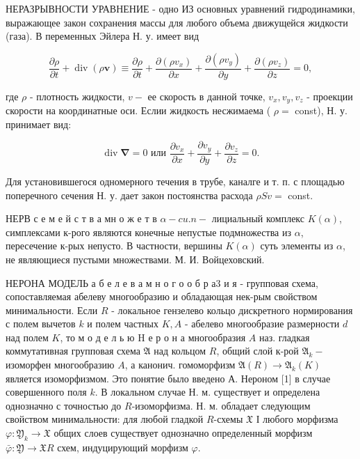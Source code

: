 \documentclass[10pt]{article}
\begin{document}
НЕРАЗРЫВНОСТИ УРАВНЕНИЕ - одно ИЗ основных уравнений гидродинамики, выражающее закон сохранения массы для любого объема движущейся жидкости (газа). В переменных Эйлера Н. у. имеет вид



\[

\frac{\partial \rho}{\partial t}+\operatorname{div}(\rho \boldsymbol{v}) \equiv \frac{\partial \rho}{\partial t}+\frac{\partial\left(\rho v_{x}\right)}{\partial x}+\frac{\partial\left(\rho v_{y}\right)}{\partial y}+\frac{\partial\left(\rho v_{z}\right)}{\partial z}=0,

\]



где $\rho$ - плотность жидкости, $v-$ ее скорость в данной точке, $v_{x}, v_{y}, v_{z}$ - проекции скорости на координатные оси. Еслии жидкость несжимаема ( $\rho=$ const), Н. у. принимает вид:



\[

\operatorname{div} \boldsymbol{\nabla}=0 \text { или } \frac{\partial v_{x}}{\partial x}+\frac{\partial v_{y}}{\partial y}+\frac{\partial v_{z}}{\partial z}=0 .

\]



Для установившегося одномерного течения в трубе, каналге и т. п. с площадью поперечного сечения Н. у. дает закон постоянства расхода $\rho S v=$ const.



НЕРВ с е м е й с т в а мн о ж е т в $\alpha-c u . n-$ лициальный комплекс $K(\alpha)$, симплексами к-рого являются конечные непустые подмножества из $\alpha$, пересечение к-рых непусто. В частности, вершины $K(\alpha)$ суть элементы из $\alpha$, не являющиеся пустыми множествами. М. И. Войцеховский.



НЕРОНА МОДЕЛЬ а б е л е в а м н о г о о б р а3 и я - групповая схема, сопоставляемая абелеву многообразию и обладающая нек-рым свойством минимальности. Если $R$ - локальное гензелево кольцо дискретного нормирования с полем вычетов $k$ и полем частных $K, A$ - абелево многообразие размерности $d$ над полем $K$, то м о д е л ь ю $\mathrm{H}$ е р о н а многообразия $A$ наз. гладкая коммутативная групповая схема $\mathfrak{A}$ над кольцом $R$, общий слой к-рой $\mathfrak{A}_{k}-$ изоморфен многообразию $A$, а канонич. гомоморфизм $\mathfrak{A}(R) \rightarrow \mathfrak{A}_{k}(K)$ является изоморфизмом. Это понятие было введено А. Нероном [1] в случае совершенного поля $k$. В локальном случае Н. м. существует и определена однозначно с точностью до $R$-изоморфизма. Н. м. обладает следующим свойством минимальности: для любой гладкой $R$-схемы $\mathfrak{X}$ І любого морфизма $\varphi: \mathfrak{Y}_{k} \rightarrow \mathfrak{X}$ общих слоев существует однозначно определенный морфизм $\bar{\varphi}: \mathfrak{Y} \rightarrow \mathfrak{X} R$ схем, индуцирующий морфизм $\varphi$.
\end{document}
